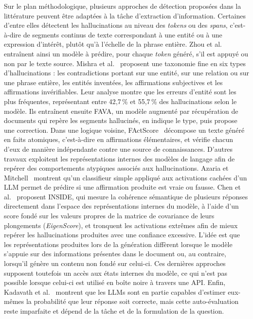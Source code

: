 Sur le plan méthodologique, plusieurs approches de détection proposées dans la littérature peuvent être adaptées à la tâche d'extraction d'information. Certaines d'entre elles détectent les hallucinations au niveau des \textit{tokens} ou des \textit{spans}, c'est-à-dire de segments continus de texte correspondant à une entité ou à une expression d'intérêt, plutôt qu'à l'échelle de la phrase entière. Zhou et al.~\cite{zhou2021detecting} entraînent ainsi un modèle à prédire, pour chaque \textit{token} généré, s'il est appuyé ou non par le texte source. Mishra et al.~\cite{mishra2024fava} proposent une taxonomie fine en six types d'hallucinations : les contradictions portant sur une entité, sur une relation ou sur une phrase entière, les entités inventées, les affirmations subjectives et les affirmations invérifiables. Leur analyse montre que les erreurs d'entité sont les plus fréquentes, représentant entre 42,7\,\% et 55,7\,\% des hallucinations selon le modèle. Ils entraînent ensuite FAVA, un modèle augmenté par récupération de documents qui repère les segments hallucinés, en indique le type, puis propose une correction. Dans une logique voisine, FActScore~\cite{min2023factscore} décompose un texte généré en faits atomiques, c'est-à-dire en affirmations élémentaires, et vérifie chacun d'eux de manière indépendante contre une source de connaissances. D'autres travaux exploitent les représentations internes des modèles de langage afin de repérer des comportements atypiques associés aux hallucinations. Azaria et Mitchell~\cite{azaria2023internal} montrent qu'un classifieur simple appliqué aux activations cachées d'un LLM permet de prédire si une affirmation produite est vraie ou fausse. Chen et al.~\cite{chen2024inside} proposent INSIDE, qui mesure la cohérence sémantique de plusieurs réponses directement dans l'espace des représentations internes du modèle, à l'aide d'un score fondé sur les valeurs propres de la matrice de covariance de leurs plongements (\textit{EigenScore}), et tronquent les activations extrêmes afin de mieux repérer les hallucinations produites avec une confiance excessive. L'idée est que les représentations produites lors de la génération diffèrent lorsque le modèle s'appuie sur des informations présentes dans le document ou, au contraire, lorsqu'il génère un contenu non fondé sur celui-ci. Ces dernières approches supposent toutefois un accès aux états internes du modèle, ce qui n'est pas possible lorsque celui-ci est utilisé en boîte noire à travers une API. Enfin, Kadavath et al.~\cite{kadavath2022know} montrent que les LLMs sont en partie capables d'estimer eux-mêmes la probabilité que leur réponse soit correcte, mais cette auto-évaluation reste imparfaite et dépend de la tâche et de la formulation de la question.

